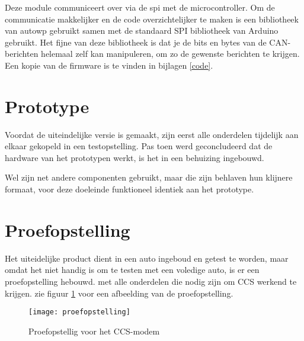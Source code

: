 Deze module communiceert over via de \ac{spi} met de microcontroller. Om de
communicatie makkelijker en de code overzichtelijker te maken is een
bibliotheek van autowp gebruikt \cite{autowp} samen met de standaard SPI
bibliotheek van Arduino gebruikt. Het fijne van deze bibliotheek is dat je de
bits en bytes van de CAN-berichten helemaal zelf kan manipuleren, om zo de
gewenste berichten te krijgen. Een kopie van de firmware is te vinden in
bijlagen \ref{code}.

\section{Prototype}

Voordat de uiteindelijke versie is gemaakt, zijn eerst alle onderdelen
tijdelijk aan elkaar gekopeld in een testopstelling. Pas toen werd
geconcludeerd dat de hardware van het prototypen werkt, is het in een behuizing
ingebouwd.

Wel zijn net andere componenten gebruikt, maar die zijn behlaven hun klijnere
formaat, voor deze doeleinde funktioneel identiek aan het prototype.

\section{Proefopstelling}
\label{sec:proefopstelling}

Het uiteidelijke product dient in een auto ingeboud en getest te worden, maar
omdat het niet handig is om te testen met een voledige auto, is er een
proefopstelling hebouwd. met alle onderdelen die nodig zijn om CCS werkend te
krijgen. zie figuur \ref{fig:proefopstelling} voor een afbeelding van de
proefopstelling.

\begin{figure}[]
    \centering
    \texttt{[image: proefopstelling]}
    \caption{Proefopstellig voor het CCS-modem}
    \label{fig:proefopstelling}
\end{figure}